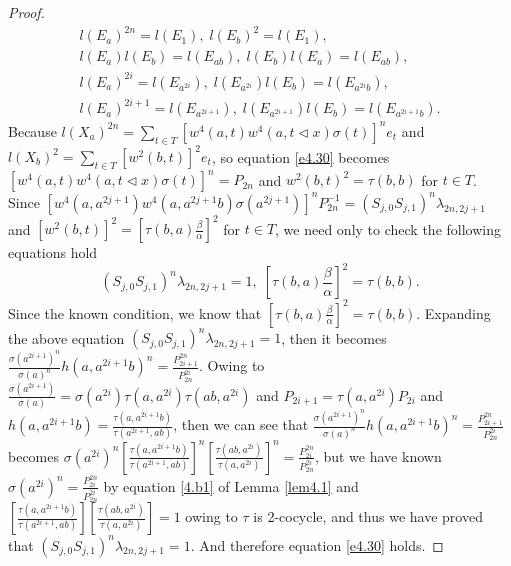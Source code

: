 \documentclass[a4paper,11pt]{amsart}
\numberwithin{equation}{section}
\begin{document}
\begin{proof}
\begin{gather}
\label{e4.38} l(E_a)^{2n}=l(E_1),\;l(E_b)^2=l(E_1),\\
\label{e4.39} l(E_a)l(E_b)=l(E_{ab}),\; l(E_b)l(E_a)=l(E_{ab}),\\
\label{e4.41} l(E_a)^{2i}=l(E_{a^{2i}}),\; l(E_{a^{2i}})l(E_b)=l(E_{a^{2i}b}),\\
\label{e4.43} l(E_a)^{2i+1}=l(E_{a^{2i+1}}),\; l(E_{a^{2i+1}})l(E_b)=l(E_{a^{2i+1}b}).
\end{gather}
Because $l(X_a)^{2n}=\sum_{t\in T}[w^4(a,t)w^4(a,t\triangleleft x)\sigma(t)]^n e_t$ and $l(X_b)^2=\sum_{t\in T}[w^2(b,t)]^2e_t$, so equation \ref{e4.30} becomes $[w^4(a,t)w^4(a,t\triangleleft x)\sigma(t)]^n=P_{2n}$ and $w^2(b,t)^2=\tau(b,b)$ for $t\in T$. Since $[w^4(a,a^{2j+1})w^4(a,a^{2j+1}b)\sigma(a^{2j+1})]^nP_{2n}^{-1}=(S_{j,0}S_{j,1})^n \lambda_{2n,2j+1}$ and $[w^2(b,t)]^2=[\tau(b,a)\frac{\beta}{\alpha}]^2$ for $t\in T$, we need only to check the following equations hold
\begin{equation}
(S_{j,0}S_{j,1})^n \lambda_{2n,2j+1}=1,\; [\tau(b,a)\frac{\beta}{\alpha}]^2=\tau(b,b). \label{a1}
\end{equation}
Since the known condition, we know that $[\tau(b,a)\frac{\beta}{\alpha}]^2=\tau(b,b)$. Expanding the above equation $(S_{j,0}S_{j,1})^n \lambda_{2n,2j+1}=1$, then it becomes
$\frac{\sigma(a^{2i+1})^n}{\sigma(a)^n}h(a,a^{2i+1}b)^n=\frac{P_{2i+1}^{2n}}{P_{2n}^{2i}}$. Owing to $\frac{\sigma(a^{2i+1})}{\sigma(a)}=\sigma(a^{2i})\tau(a,a^{2i})\tau(ab,a^{2i})$ and $P_{2i+1}=\tau(a,a^{2i})P_{2i}$ and $h(a,a^{2i+1}b)=\frac{\tau(a,a^{2i+1}b)}{\tau(a^{2i+1},ab)}$, then we can see that $\frac{\sigma(a^{2i+1})^n}{\sigma(a)^n} h(a,a^{2i+1}b)^n=\frac{P_{2i+1}^{2n}}{P_{2n}^{2i}}$
becomes $\sigma(a^{2i})^n [\frac{\tau(a,a^{2i+1}b)}{\tau(a^{2i+1},ab)}]^n [\frac{\tau(ab,a^{2i})}{\tau(a,a^{2i})}]^n=\frac{P_{2i}^{2n}}{P_{2n}^{2i}}$,
but we have known $\sigma(a^{2i})^n=\frac{P_{2i}^{2n}}{P_{2n}^{2i}}$ by equation \ref{4.b1} of Lemma \ref{lem4.1} and $[\frac{\tau(a,a^{2i+1}b)}{\tau(a^{2i+1},ab)}] [\frac{\tau(ab,a^{2i})}{\tau(a,a^{2i})}]=1$ owing to $\tau$ is 2-cocycle, and thus we have proved that $(S_{j,0}S_{j,1})^n \lambda_{2n,2j+1}=1$. And therefore equation \ref{e4.30} holds.



\end{proof}
\end{document}

